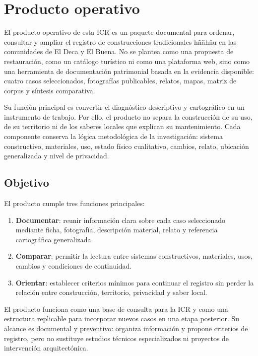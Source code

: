 \section{Producto operativo}

El producto operativo de esta ICR es un paquete documental para ordenar, consultar y ampliar el registro de construcciones tradicionales hñähñu en las comunidades de El Deca y El Buena. No se plantea como una propuesta de restauración, como un catálogo turístico ni como una plataforma web, sino como una herramienta de documentación patrimonial basada en la evidencia disponible: cuatro casos seleccionados, fotografías publicables, relatos, mapas, matriz de corpus y síntesis comparativa.

Su función principal es convertir el diagnóstico descriptivo y cartográfico en un instrumento de trabajo. Por ello, el producto no separa la construcción de su uso, de su territorio ni de los saberes locales que explican su mantenimiento. Cada componente conserva la lógica metodológica de la investigación: sistema constructivo, materiales, uso, estado físico cualitativo, cambios, relato, ubicación generalizada y nivel de privacidad.

\subsection{Objetivo}

El producto cumple tres funciones principales:

\begin{enumerate}
	\item \textbf{Documentar}: reunir información clara sobre cada caso seleccionado mediante ficha, fotografía, descripción material, relato y referencia cartográfica generalizada.
	\item \textbf{Comparar}: permitir la lectura entre sistemas constructivos, materiales, usos, cambios y condiciones de continuidad.
	\item \textbf{Orientar}: establecer criterios mínimos para continuar el registro sin perder la relación entre construcción, territorio, privacidad y saber local.
\end{enumerate}

El producto funciona como una base de consulta para la ICR y como una estructura replicable para incorporar nuevos casos en una etapa posterior. Su alcance es documental y preventivo: organiza información y propone criterios de registro, pero no sustituye estudios técnicos especializados ni proyectos de intervención arquitectónica.

